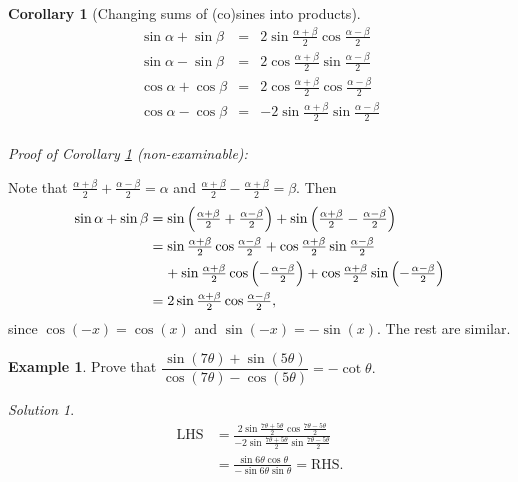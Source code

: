 \documentclass[
  12pt,
  oneside]{book}
\newtheorem{corollary}{Corollary}[chapter]
\theoremstyle{definition}
\theoremstyle{definition}
\newtheorem{example}{Example}[chapter]
\theoremstyle{definition}
\theoremstyle{definition}
\theoremstyle{remark}
\newtheorem*{solution}{Solution}
\begin{document}
\begin{corollary}[Changing sums of (co)sines into products]
\protect\hypertarget{cor:t20-prods}{}\label{cor:t20-prods}\[\boxed{
\begin{array}{rcl}
\sin\alpha + \sin\beta &=& 2\sin\tfrac{\alpha+\beta}2\cos\tfrac{\alpha-\beta}2\\
\sin\alpha - \sin\beta &=& 2\cos\tfrac{\alpha+\beta}2\sin\tfrac{\alpha-\beta}2\\
\cos\alpha + \cos\beta &=& 2\cos\tfrac{\alpha+\beta}2\cos\tfrac{\alpha-\beta}2\\
\cos\alpha - \cos\beta &=& - 2\sin\tfrac{\alpha+\beta}2\sin\tfrac{\alpha-\beta}2\\
\end{array}
}\]
\end{corollary}

\emph{Proof of Corollary \ref{cor:t20-prods} (non-examinable):}

Note that \(\frac{\alpha+\beta}2+\frac{\alpha-\beta}2 = \alpha\) and
\(\frac{\alpha+\beta}2-\frac{\alpha+\beta}2=\beta\). Then
\begin{align*}
\sin\alpha+\sin\beta &= \sin\left(\tfrac{\alpha+\beta}2+\tfrac{\alpha-\beta}2\right) +
  \sin\left(\tfrac{\alpha+\beta}2-\tfrac{\alpha-\beta}2\right)\notag\\
 &= \sin\tfrac{\alpha+\beta}2\cos\tfrac{\alpha-\beta}2 + \cos\tfrac{\alpha+\beta}2\sin\tfrac{\alpha-\beta}2 \notag\\
 &\phantom{=}\,\,
  + \sin\tfrac{\alpha+\beta}2\cos\left(-\tfrac{\alpha-\beta}2\right) + \cos\tfrac{\alpha+\beta}2\sin\left(-\tfrac{\alpha-\beta}2\right) \notag\\
 &= 2\sin\tfrac{\alpha+\beta}2\cos\tfrac{\alpha-\beta}2,
\end{align*}
since \(\cos(-x)=\cos(x)\) and \(\sin(-x)=-\sin(x)\). The rest are similar.

\begin{example}
Prove that \(\dfrac{\sin(7\theta)+\sin(5\theta)}{\cos(7\theta) - \cos(5\theta)} = -\cot\theta.\)
\end{example}

\begin{solution}
\begin{align*}
\mathrm{LHS} &= \frac{2\sin\frac{7\theta+5\theta}{2}\cos\frac{7\theta-5\theta}{2}}{-2\sin\frac{7\theta+5\theta}{2}\sin\frac{7\theta-5\theta}{2}}\\
&= \frac{\sin6\theta\cos\theta}{-\sin6\theta\sin\theta} = \mathrm{RHS}.
\end{align*}
\end{solution}
\end{document}
